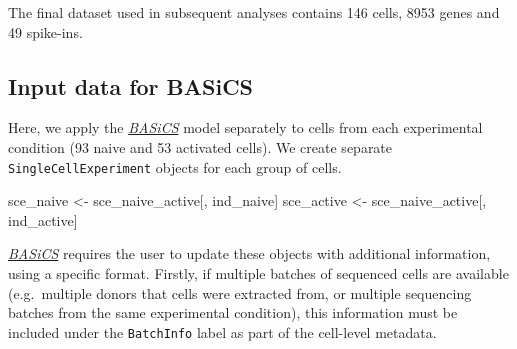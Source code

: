 \documentclass[9pt,a4paper,]{extarticle}
\newenvironment{Shaded}{\begin{snugshade}}{\end{snugshade}}
\newcommand{\DecValTok}[1]{\textcolor[rgb]{0.00,0.00,0.81}{#1}}
\newcommand{\KeywordTok}[1]{\textcolor[rgb]{0.13,0.29,0.53}{\textbf{#1}}}
\newcommand{\NormalTok}[1]{#1}
\newcommand{\OperatorTok}[1]{\textcolor[rgb]{0.81,0.36,0.00}{\textbf{#1}}}
\newcommand{\StringTok}[1]{\textcolor[rgb]{0.31,0.60,0.02}{#1}}
\begin{document}
\begin{Shaded}
\end{Shaded}

The final dataset used in subsequent analyses contains
146 cells, 8953 genes and
49 spike-ins.

\hypertarget{input-data-for-basics}{%
\subsection{Input data for BASiCS}\label{input-data-for-basics}}

Here, we apply the \emph{\href{https://bioconductor.org/packages/3.11/BASiCS}{BASiCS}} model separately to cells from each
experimental condition (93
naive and 53 activated cells).
We create separate \texttt{SingleCellExperiment} objects for each group of cells.

\begin{Shaded}
\begin{Highlighting}[]
\NormalTok{sce_naive <-}\StringTok{ }\NormalTok{sce_naive_active[, ind_naive]}
\NormalTok{sce_active <-}\StringTok{ }\NormalTok{sce_naive_active[, ind_active]}
\end{Highlighting}
\end{Shaded}

\emph{\href{https://bioconductor.org/packages/3.11/BASiCS}{BASiCS}} requires the user to update these objects with additional
information, using a specific format.
Firstly, if multiple batches of sequenced cells are available (e.g.~multiple
donors that cells were extracted from, or multiple sequencing batches from the
same experimental condition), this information must be included under the
\texttt{BatchInfo} label as part of the cell-level metadata.
\end{document}
